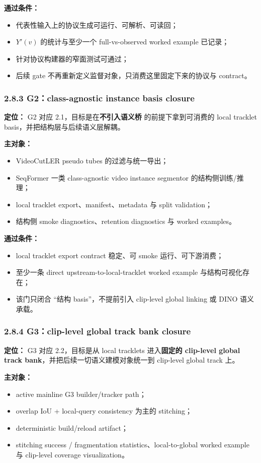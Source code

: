 \documentclass[UTF8]{ctexart}
\begin{document}
\textbf{通过条件：}
\begin{itemize}
\item 代表性输入上的协议生成可运行、可解析、可读回；
\item $Y'(v)$ 的统计与至少一个 full-vs-observed worked example 已记录；
\item 针对协议构建器的窄面测试可通过；
\item 后续 gate 不再重新定义监督对象，只消费这里固定下来的协议与 contract。
\end{itemize}

\subsubsection*{2.8.3 G2：class-agnostic instance basis closure}
\textbf{定位：} G2 对应 2.1，目标是在\textbf{不引入语义桥} 的前提下拿到可消费的 local tracklet basis，并把结构层与后续语义层解耦。

\textbf{主对象：}
\begin{itemize}
\item VideoCutLER pseudo tubes 的过滤与统一导出；
\item SeqFormer 一类 class-agnostic video instance segmentor 的结构侧训练/推理；
\item local tracklet export、manifest、metadata 与 split validation；
\item 结构侧 smoke diagnostics、retention diagnostics 与 worked examples。
\end{itemize}

\textbf{通过条件：}
\begin{itemize}
\item local tracklet export contract 稳定、可 smoke 运行、可下游消费；
\item 至少一条 direct upstream-to-local-tracklet worked example 与结构可视化存在；
\item 该门只闭合 ``结构 basis''，不提前引入 clip-level global linking 或 DINO 语义承载。
\end{itemize}

\subsubsection*{2.8.4 G3：clip-level global track bank closure}
\textbf{定位：} G3 对应 2.2，目标是从 local tracklets 进入\textbf{固定的 clip-level global track bank}，并把后续一切语义建模对象统一到 clip-level global track 上。

\textbf{主对象：}
\begin{itemize}
\item active mainline G3 builder/tracker path；
\item overlap IoU + local-query consistency 为主的 stitching；
\item deterministic build/reload artifact；
\item stitching success / fragmentation statistics、local-to-global worked example 与 clip-level coverage visualization。
\end{itemize}
\end{document}
